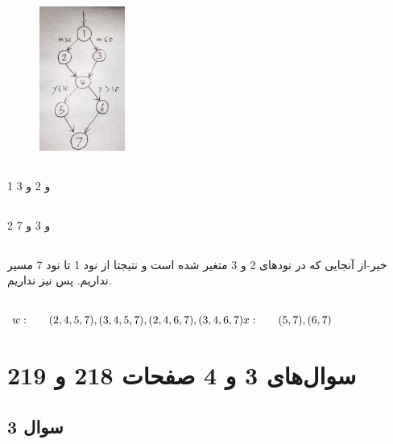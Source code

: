 \documentclass{article}
\begin{document}
\subsection{}
\begin{figure}[H]
    \centering
    \includegraphics[width=0.25\textwidth]{figures/swt2.jpg}
    \caption
	{}
    \label{fig:fig1}
\end{figure}
\subsection{}
1 و 2 و 3
\subsection{}
2 و 3 و 7
\subsection{}
خیر-از آنجایی که در نودهای 2 و 3 متغیر   شده است و نتیجتا از نود 1 تا نود 7 مسیر  نداریم. پس  نیز نداریم.
\subsection{}
\begin{latin}
$
w:\:\:\:\:\:\:\:\:(2, 4, 5, 7), (3, 4, 5, 7), (2, 4, 6, 7), (3, 4, 6, 7)\\
x:\:\:\:\:\:\:\:\:(5, 7), (6, 7)
$
\end{latin}

\section{سوال‌های 3 و 4 صفحات 218 و 219}


\subsection{سوال 3}
\end{document}
